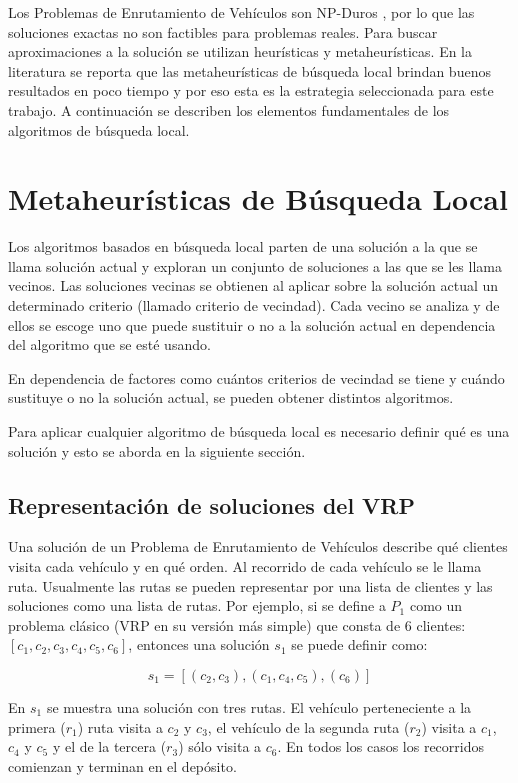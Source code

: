 Los Problemas de Enrutamiento de Vehículos son NP-Duros \cite{2002vehicle}, por lo que las soluciones exactas no son factibles para problemas reales. Para buscar aproximaciones a la solución se utilizan heurísticas y metaheurísticas. En la literatura se reporta \cite{puede} que las metaheurísticas de búsqueda local brindan buenos resultados en poco tiempo y por eso esta es la estrategia seleccionada para este trabajo. A continuación se describen los elementos fundamentales de los algoritmos de búsqueda local.

\section{Metaheurísticas de Búsqueda Local}\label{1-local}
Los algoritmos basados en búsqueda local parten de una solución a la que se llama solución actual y exploran un conjunto de soluciones a las que se les llama vecinos. Las soluciones vecinas se obtienen al aplicar sobre la solución actual un determinado criterio (llamado criterio de vecindad). Cada vecino se analiza y de ellos se escoge uno que puede sustituir o no a la solución actual en dependencia del algoritmo que se esté usando. 

En dependencia de factores como cuántos criterios de vecindad se tiene y cuándo sustituye o no la solución actual, se pueden obtener distintos algoritmos.

Para aplicar cualquier algoritmo de búsqueda local es necesario definir qué es una solución y esto se aborda en la siguiente sección.

\subsection{Representación de soluciones del VRP}\label{1-sol}
Una solución de un Problema de Enrutamiento de Vehículos describe qué clientes visita cada vehículo y en qué orden. Al recorrido de cada vehículo se le llama ruta. Usualmente las rutas se pueden representar por una lista de clientes y las soluciones como una lista de rutas. Por ejemplo, si se define a $P_1$ como un problema clásico (VRP en su versión más simple) que consta de 6 clientes: $[c_1, c_2, c_3, c_4, c_5, c_6]$, entonces una solución $s_1$ se puede definir como:

\begin{equation}
	s_1 = [(c_2,c_3), (c_1,c_4,c_5), (c_6)]
\end{equation}

En $s_1$ se muestra una solución con tres rutas. El vehículo perteneciente a la primera ($r_1$) ruta visita a $c_2$ y $c_3$, el vehículo de la segunda ruta ($r_2$) visita a $c_1$, $c_4$ y $c_5$ y el de la tercera ($r_3$) sólo visita a $c_6$. En todos los casos los recorridos comienzan y terminan en el depósito.

